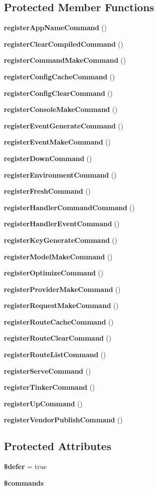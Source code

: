 \subsection*{Protected Member Functions}
\begin{DoxyCompactItemize}
\item 
{\bf register\+App\+Name\+Command} ()
\item 
{\bf register\+Clear\+Compiled\+Command} ()
\item 
{\bf register\+Command\+Make\+Command} ()
\item 
{\bf register\+Config\+Cache\+Command} ()
\item 
{\bf register\+Config\+Clear\+Command} ()
\item 
{\bf register\+Console\+Make\+Command} ()
\item 
{\bf register\+Event\+Generate\+Command} ()
\item 
{\bf register\+Event\+Make\+Command} ()
\item 
{\bf register\+Down\+Command} ()
\item 
{\bf register\+Environment\+Command} ()
\item 
{\bf register\+Fresh\+Command} ()
\item 
{\bf register\+Handler\+Command\+Command} ()
\item 
{\bf register\+Handler\+Event\+Command} ()
\item 
{\bf register\+Key\+Generate\+Command} ()
\item 
{\bf register\+Model\+Make\+Command} ()
\item 
{\bf register\+Optimize\+Command} ()
\item 
{\bf register\+Provider\+Make\+Command} ()
\item 
{\bf register\+Request\+Make\+Command} ()
\item 
{\bf register\+Route\+Cache\+Command} ()
\item 
{\bf register\+Route\+Clear\+Command} ()
\item 
{\bf register\+Route\+List\+Command} ()
\item 
{\bf register\+Serve\+Command} ()
\item 
{\bf register\+Tinker\+Command} ()
\item 
{\bf register\+Up\+Command} ()
\item 
{\bf register\+Vendor\+Publish\+Command} ()
\end{DoxyCompactItemize}
\subsection*{Protected Attributes}
\begin{DoxyCompactItemize}
\item 
{\bf \$defer} = true
\item 
{\bf \$commands}
\end{DoxyCompactItemize}

